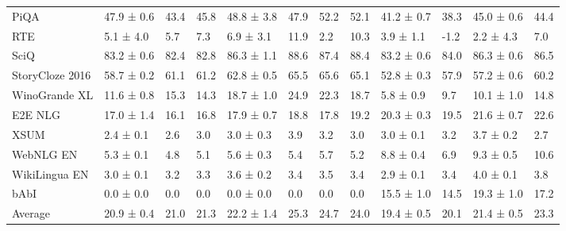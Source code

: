 \documentclass{article}
\begin{document}
\begin{table}[htbp]
{\begin{tabular}{l|lll|llll|ll|ll}
PiQA & 47.9 ± 0.6 & 43.4 & 45.8 & 48.8 ± 3.8 & 47.9 & 52.2 & 52.1 & 41.2 ± 0.7 & 38.3 & 45.0 ± 0.6 & 44.4 \\
RTE & 5.1 ± 4.0 & 5.7 & 7.3 & 6.9 ± 3.1 & 11.9 & 2.2 & 10.3 & 3.9 ± 1.1 & -1.2 & 2.2 ± 4.3 & 7.0 \\
SciQ & 83.2 ± 0.6 & 82.4 & 82.8 & 86.3 ± 1.1 & 88.6 & 87.4 & 88.4 & 83.2 ± 0.6 & 84.0 & 86.3 ± 0.6 & 86.5 \\
StoryCloze 2016 & 58.7 ± 0.2 & 61.1 & 61.2 & 62.8 ± 0.5 & 65.5 & 65.6 & 65.1 & 52.8 ± 0.3 & 57.9 & 57.2 ± 0.6 & 60.2 \\
WinoGrande XL & 11.6 ± 0.8 & 15.3 & 14.3 & 18.7 ± 1.0 & 24.9 & 22.3 & 18.7 & 5.8 ± 0.9 & 9.7 & 10.1 ± 1.0 & 14.8 \\
\midrule
E2E NLG & 17.0 ± 1.4 & 16.1 & 16.8 & 17.9 ± 0.7 & 18.8 & 17.8 & 19.2 & 20.3 ± 0.3 & 19.5 & 21.6 ± 0.7 & 22.6 \\
XSUM & 2.4 ± 0.1 & 2.6 & 3.0 & 3.0 ± 0.3 & 3.9 & 3.2 & 3.0 & 3.0 ± 0.1 & 3.2 & 3.7 ± 0.2 & 2.7 \\
WebNLG EN & 5.3 ± 0.1 & 4.8 & 5.1 & 5.6 ± 0.3 & 5.4 & 5.7 & 5.2 & 8.8 ± 0.4 & 6.9 & 9.3 ± 0.5 & 10.6 \\
WikiLingua EN & 3.0 ± 0.1 & 3.2 & 3.3 & 3.6 ± 0.2 & 3.4 & 3.5 & 3.4 & 2.9 ± 0.1 & 3.4 & 4.0 ± 0.1 & 3.8 \\
\midrule
bAbI & 0.0 ± 0.0 & 0.0 & 0.0 & 0.0 ± 0.0 & 0.0 & 0.0 & 0.0 & 15.5 ± 1.0 & 14.5 & 19.3 ± 1.0 & 17.2 \\
\midrule
Average & 20.9 ± 0.4 & 21.0 & 21.3 & 22.2 ± 1.4 & 25.3 & 24.7 & 24.0 & 19.4 ± 0.5 & 20.1 & 21.4 ± 0.5 & 23.3 \\
\bottomrule
  \end{tabular}
  }
  \label{tab:pplx}
\end{table}
\end{document}

